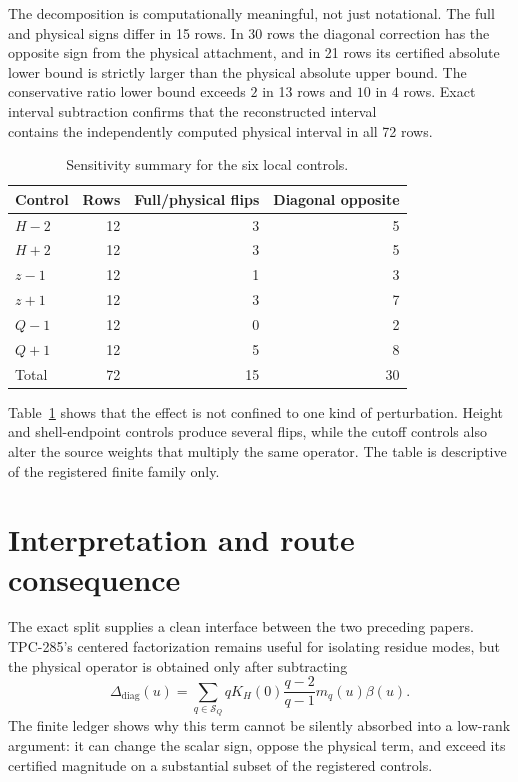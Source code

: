 \documentclass[11pt]{article}
\newcommand{\1}{\mathbf{1}}
\newcommand{\full}{\mathrm{full}}
\newcommand{\del}{\mathrm{diag}}
\begin{document}
The decomposition is computationally meaningful, not just notational.  The
full and physical signs differ in 15 rows.  In 30 rows the diagonal correction
has the opposite sign from the physical attachment, and in 21 rows its
certified absolute lower bound is strictly larger than the physical absolute
upper bound.  The conservative ratio lower bound exceeds $2$ in 13 rows and
$10$ in 4 rows.  Exact interval subtraction confirms that the reconstructed
interval
\begin{equation}
 [C_{\full}^{-}-C_{\del}^{+},\ C_{\full}^{+}-C_{\del}^{-}]
 \label{eq:reconstruction}
\end{equation}
contains the independently computed physical interval in all 72 rows.

\begin{table}[H]
\centering
\small
\caption{Sensitivity summary for the six local controls.}
\label{tab:controls}
\begin{tabular}{lrrr}
\toprule
Control & Rows & Full/physical flips & Diagonal opposite\\
\midrule
$H-2$ & 12 & 3 & 5\\
$H+2$ & 12 & 3 & 5\\
$z-1$ & 12 & 1 & 3\\
$z+1$ & 12 & 3 & 7\\
$Q-1$ & 12 & 0 & 2\\
$Q+1$ & 12 & 5 & 8\\
\midrule
Total & 72 & 15 & 30\\
\bottomrule
\end{tabular}
\end{table}

Table~\ref{tab:controls} shows that the effect is not confined to one kind of
perturbation.  Height and shell-endpoint controls produce several flips, while
the cutoff controls also alter the source weights that multiply the same
operator.  The table is descriptive of the registered finite family only.

\section{Interpretation and route consequence}

The exact split supplies a clean interface between the two preceding papers.
TPC-285's centered factorization remains useful for isolating residue modes,
but the physical operator is obtained only after subtracting
\begin{equation}
 \Delta_{\del}(u)=\sum_{q\in\mathcal S_Q}qK_H(0)
 \frac{q-2}{q-1}m_q(u)\beta(u).
 \label{eq:delta}
\end{equation}
The finite ledger shows why this term cannot be silently absorbed into a
low-rank argument: it can change the scalar sign, oppose the physical term,
and exceed its certified magnitude on a substantial subset of the registered
controls.
\end{document}
